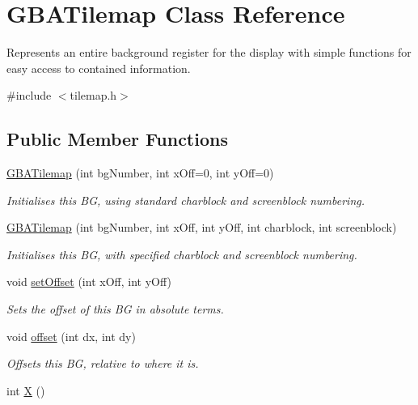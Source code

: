 \hypertarget{class_g_b_a_tilemap}{\section{G\-B\-A\-Tilemap Class Reference}
\label{class_g_b_a_tilemap}
}


Represents an entire background register for the display with simple functions for easy access to contained information.  




{\ttfamily \#include $<$tilemap.\-h$>$}

\subsection*{Public Member Functions}
\begin{DoxyCompactItemize}
\item 
\hyperlink{class_g_b_a_tilemap_af97e2847378557845a9677a22f54b3c8}{G\-B\-A\-Tilemap} (int bg\-Number, int x\-Off=0, int y\-Off=0)
\begin{DoxyCompactList}\small\item\em Initialises this B\-G, using standard charblock and screenblock numbering. \end{DoxyCompactList}\item 
\hyperlink{class_g_b_a_tilemap_a478fb5b5fe0274b6eba638b2643dd7a7}{G\-B\-A\-Tilemap} (int bg\-Number, int x\-Off, int y\-Off, int charblock, int screenblock)
\begin{DoxyCompactList}\small\item\em Initialises this B\-G, with specified charblock and screenblock numbering. \end{DoxyCompactList}\item 
void \hyperlink{class_g_b_a_tilemap_aa965c5ff1b0738466d2336ee02a329f4}{set\-Offset} (int x\-Off, int y\-Off)
\begin{DoxyCompactList}\small\item\em Sets the offset of this B\-G in absolute terms. \end{DoxyCompactList}\item 
void \hyperlink{class_g_b_a_tilemap_a153737902839590c84c81fc84415a39b}{offset} (int dx, int dy)
\begin{DoxyCompactList}\small\item\em Offsets this B\-G, relative to where it is. \end{DoxyCompactList}\item 
\hypertarget{class_g_b_a_tilemap_a682ab6f960941dfde2bfc9c2f0e05796}{int \hyperlink{class_g_b_a_tilemap_a682ab6f960941dfde2bfc9c2f0e05796}{X} ()}\label{class_g_b_a_tilemap_a682ab6f960941dfde2bfc9c2f0e05796}


\end{DoxyCompactItemize}

